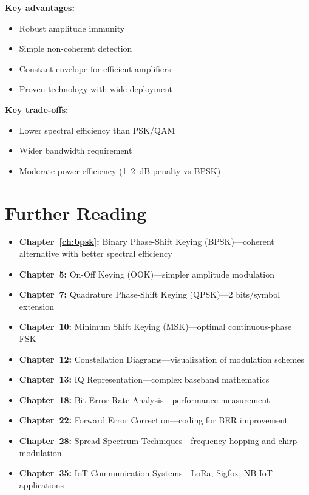\textbf{Key advantages:}
\begin{itemize}
\item Robust amplitude immunity
\item Simple non-coherent detection
\item Constant envelope for efficient amplifiers
\item Proven technology with wide deployment
\end{itemize}

\textbf{Key trade-offs:}
\begin{itemize}
\item Lower spectral efficiency than PSK/QAM
\item Wider bandwidth requirement
\item Moderate power efficiency (1--2~dB penalty vs BPSK)
\end{itemize}

\section{Further Reading}

\begin{itemize}
\item \textbf{Chapter~\ref{ch:bpsk}:} Binary Phase-Shift Keying (BPSK)---coherent alternative with better spectral efficiency
\item \textbf{Chapter~5:} On-Off Keying (OOK)---simpler amplitude modulation
\item \textbf{Chapter~7:} Quadrature Phase-Shift Keying (QPSK)---2 bits/symbol extension
\item \textbf{Chapter~10:} Minimum Shift Keying (MSK)---optimal continuous-phase FSK
\item \textbf{Chapter~12:} Constellation Diagrams---visualization of modulation schemes
\item \textbf{Chapter~13:} IQ Representation---complex baseband mathematics
\item \textbf{Chapter~18:} Bit Error Rate Analysis---performance measurement
\item \textbf{Chapter~22:} Forward Error Correction---coding for BER improvement
\item \textbf{Chapter~28:} Spread Spectrum Techniques---frequency hopping and chirp modulation
\item \textbf{Chapter~35:} IoT Communication Systems---LoRa, Sigfox, NB-IoT applications
\end{itemize}
